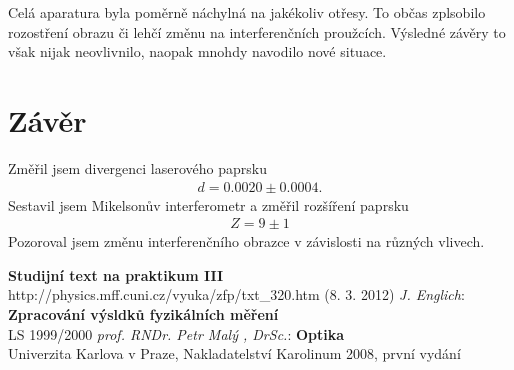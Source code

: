 \documentclass[a4paper,12pt]{article}
\begin{document}
Celá aparatura byla poměrně náchylná na jakékoliv otřesy. To občas zplsobilo rozostření obrazu či lehčí změnu na interferenčních proužcích. Výsledné 
závěry to však nijak neovlivnilo, naopak mnohdy navodilo nové situace.

\section{Závěr}
\noindent
Změřil jsem divergenci laserového paprsku
\begin{eqnarray}
d=0.0020 \pm 0.0004.
\end{eqnarray}
Sestavil jsem Mikelsonův interferometr a změřil rozšíření paprsku
\begin{eqnarray}
Z=9 \pm 1
\end{eqnarray}
Pozoroval jsem změnu interferenčního obrazce v závislosti na různých vlivech.

\eject
\begin{thebibliography}{5}
	 \textbf{Studijní text na praktikum III} \\http://physics.mff.cuni.cz/vyuka/zfp/txt\_320.htm (8. 3. 2012)
     \emph{J. Englich}: \textbf{Zpracování výsldků fyzikálních měření} \\ LS 1999/2000
     \emph{prof. RNDr. Petr Malý , DrSc.}: \textbf{Optika}\\Univerzita Karlova v Praze, Nakladatelství Karolinum 2008, první vydání
\end{thebibliography}
\end{document}
